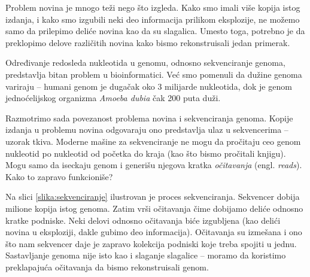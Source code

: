 \fi 

Problem novina je mnogo teži nego što izgleda. Kako smo imali više kopija istog izdanja, i kako smo izgubili neki deo informacija prilikom eksplozije, ne možemo samo da prilepimo deliće novina kao da su slagalica. Umesto toga, potrebno je da preklopimo delove različitih novina kako bismo rekonstruisali jedan primerak.

Određivanje redosleda nukleotida u genomu, odnosno sekvenciranje genoma, predstavlja bitan problem u bioinformatici. Ve\'c smo pomenuli da dužine genoma variraju -- humani genom je dugačak oko 3 milijarde nukleotida, dok je genom jednoćelijskog organizma \emph{Amoeba dubia} čak 200 puta duži. 

Razmotrimo sada povezanost problema novina i sekvenciranja genoma. Kopije izdanja u problemu novina odgovaraju ono predstavlja ulaz u sekvencerima -- uzorak tkiva. Moderne mašine za sekvenciranje ne mogu da pročitaju ceo genom nukleotid po nukleotid od početka do kraja (kao što bismo pročitali knjigu). Mogu samo da iseckaju genom i generišu njegova kratka \emph{očitavanja} (engl. \emph{reads}). Kako to zapravo funkcioniše? 

Na slici \ref{slika:sekvenciranje} ilustrovan je proces sekvenciranja. Sekvencer dobija milione kopija istog genoma. Zatim vrši očitavanja čime dobijamo deliće odnosno kratke podniske. Neki delovi odnosno očitavanja biće izgubljena (kao delići novina u eksploziji, dakle gubimo deo informacija). Očitavanja su izmešana i ono što nam sekvencer daje je zapravo kolekcija podniski koje treba spojiti u jednu. Sastavljanje genoma nije isto kao i slaganje slagalice -- moramo da koristimo preklapajuća očitavanja da bismo rekonstruisali genom.

